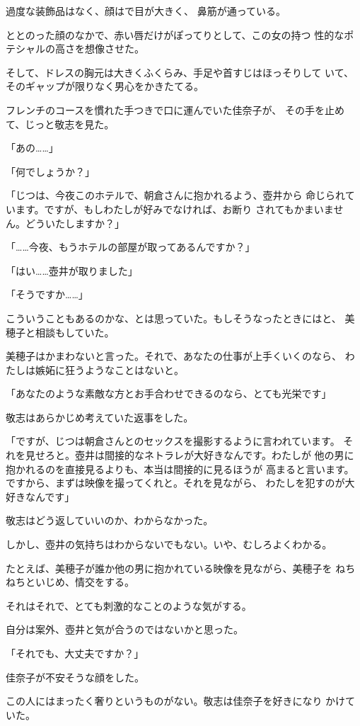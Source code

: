 ﻿\documentclass[
    book,tate,
    line_length=30zw,
    jafontsize=12pt,
    paper=b5j,
    landscape,
    ]{jlreq}
\begin{document}
過度な装飾品はなく、顔はで目が大きく、
鼻筋が通っている。

ととのった顔のなかで、赤い唇だけがぽってりとして、この女の持つ
性的なポテシャルの高さを想像させた。

そして、ドレスの胸元は大きくふくらみ、手足や首すじはほっそりして
いて、そのギャップが限りなく男心をかきたてる。

フレンチのコースを慣れた手つきで口に運んでいた佳奈子が、
その手を止めて、じっと敬志を見た。

「あの……」

「何でしょうか？」

「じつは、今夜このホテルで、朝倉さんに抱かれるよう、壺井から
命じられています。ですが、もしわたしが好みでなければ、お断り
されてもかまいません。どういたしますか？」

「……今夜、もうホテルの部屋が取ってあるんですか？」

「はい……壺井が取りました」

「そうですか……」

こういうこともあるのかな、とは思っていた。もしそうなったときにはと、
美穂子と相談もしていた。

美穂子はかまわないと言った。それで、あなたの仕事が上手くいくのなら、
わたしは嫉妬に狂うようなことはないと。

「あなたのような素敵な方とお手合わせできるのなら、とても光栄です」

敬志はあらかじめ考えていた返事をした。

「ですが、じつは朝倉さんとのセックスを撮影するように言われています。
それを見せろと。壺井は間接的なネトラレが大好きなんです。わたしが
他の男に抱かれるのを直接見るよりも、本当は間接的に見るほうが
高まると言います。ですから、まずは映像を撮ってくれと。それを見ながら、
わたしを犯すのが大好きなんです」

敬志はどう返していいのか、わからなかった。

しかし、壺井の気持ちはわからないでもない。いや、むしろよくわかる。

たとえば、美穂子が誰か他の男に抱かれている映像を見ながら、美穂子を
ねちねちといじめ、情交をする。

それはそれで、とても刺激的なことのような気がする。

自分は案外、壺井と気が合うのではないかと思った。

「それでも、大丈夫ですか？」

佳奈子が不安そうな顔をした。

この人にはまったく奢りというものがない。敬志は佳奈子を好きになり
かけていた。
\end{document}
